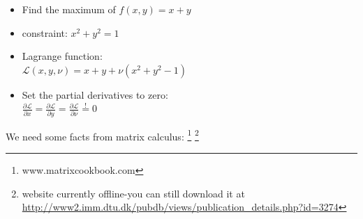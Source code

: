 		\begin{itemize}
			\item Find the maximum of $f(x,y) = x +y$ 
			\item constraint: $x^2 + y^2 = 1$ 
			\item Lagrange function: \\
			      $\mathcal L(x,y,\nu) = x + y + \nu(x^2 + y^2 - 1)$ 
			\item Set the partial derivatives to zero: \\
			      $\frac{\partial \mathcal L}{\partial x} =
				      \frac{\partial \mathcal L}{\partial y} =
				      \frac{\partial \mathcal L}{\partial \nu}
				      \stackrel{!}{=} 0$
		\end{itemize}
	We need some facts from matrix calculus: 	\footnote{www.matrixcookbook.com} \footnote{website currently offline-you can still download it at \url{http://www2.imm.dtu.dk/pubdb/views/publication_details.php?id=3274} } 
	
